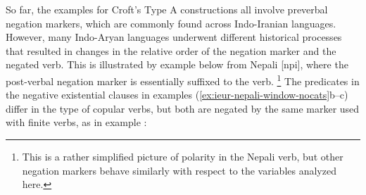 ﻿\documentclass[output=paper]{langsci/langscibook}
\begin{document}
\begin{exe}
{So far, the examples for Croft's Type A constructions all involve preverbal
negation markers, which are commonly found across Indo-Iranian languages.
However, many Indo-Aryan languages underwent different historical processes
that resulted in changes in the relative order of the negation marker and
the negated verb. This is illustrated by example  below
from Nepali [npi], where the post-verbal negation marker is essentially
suffixed to the verb.%
%
\footnote{This is a rather simplified picture of
polarity in the Nepali verb, but other negation markers behave similarly
with respect to the variables analyzed here.}
%
The predicates in the negative existential clauses in examples
(\ref{ex:ieur-nepali-window-nocats}b--c) differ in the type of
copular verbs, but both are negated by the same marker used with finite
verbs, as in example :
%
\begin{exe}\ex\label{ex:ieur-nepali-window-nocats}

\end{exe}}
\end{exe}
\end{document}
